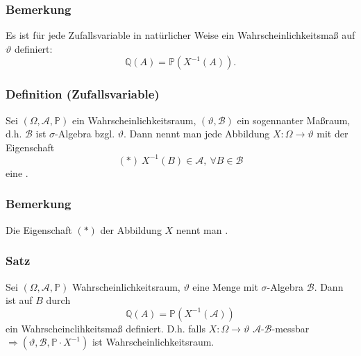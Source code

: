 \subsubsection{Bemerkung}
Es ist f\"ur jede Zufallsvariable in nat\"urlicher Weise ein Wahrscheinlichkeitsma\ss{} auf $\vartheta$ definiert:
\[\mathbb{Q}(A)=\mathbb{P}(X^{-1}(A)).\]
\subsubsection{Definition (Zufallsvariable)}
Sei $(\Omega,\mathcal{A},\mathbb{P})$ ein Wahrscheinlichkeitsraum, $(\vartheta,\mathcal{B})$ ein sogennanter Ma\ss{}raum, d.h. $\mathcal{B}$ ist $\sigma$-Algebra bzgl. $\vartheta$. Dann nennt man jede Abbildung $X\colon\Omega\to\vartheta$ mit der Eigenschaft
\[(*)\ X^{-1}(B)\in\mathcal{A},\ \forall B\in\mathcal{B}\]
eine .
\subsubsection{Bemerkung}
Die Eigenschaft $(*)$ der Abbildung $X$ nennt man .
\subsubsection{Satz}
Sei $(\Omega,\mathcal{A},\mathbb{P})$ Wahrscheinlichkeitsraum, $\vartheta$ eine Menge mit $\sigma$-Algebra $\mathcal{B}$. Dann ist auf $B$ durch
\[\mathbb{Q}(A)=\mathbb{P}(X^{-1}(\mathcal{A}))\]
ein Wahrscheinclihkeitsma\ss{} definiert. D.h. falls $X\colon\Omega\to\vartheta$ $\mathcal{A}$-$\mathcal{B}$-messbar $\Rightarrow(\vartheta,\mathcal{B},\mathbb{P}\cdot X^{-1})$ ist Wahrscheinlichkeitsraum.
